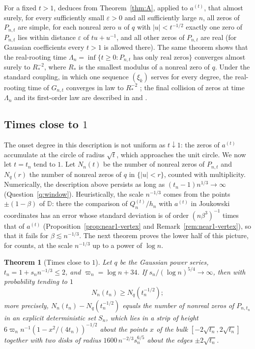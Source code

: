 \documentclass[11pt]{amsart}
\newtheorem{theorem}{Theorem}[section]
\theoremstyle{definition}
\theoremstyle{remark}
\numberwithin{equation}{section}
\newcommand{\D}{\mathbb{D}}
\newcommand{\eps}{\varepsilon}
\begin{document}
For a fixed $t>1$, \cite[Theorem~\ref{M-thm:heat}]{Main} deduces from Theorem~\ref{thm:A}, applied to $a^{(t)}$, that almost surely, for every sufficiently small $\eps>0$ and all sufficiently large $n$, all zeros of $P_{n,t}$ are simple, for each nonreal zero $u$ of $q$ with $|u|<t^{-1/2}$ exactly one zero of $P_{n,t}$ lies within distance $\eps$ of $tu+u^{-1}$, and all other zeros of $P_{n,t}$ are real (for Gaussian coefficients every $t>1$ is allowed there). The same theorem shows that the real-rooting time $\Lambda_n=\inf\{t\ge0:P_{n,t}\text{ has only real zeros}\}$ converges almost surely to $R_*^{-2}$, where $R_*$ is the smallest modulus of a nonreal zero of $q$. Under the standard coupling, in which one sequence $(\xi_k)$ serves for every degree, the real-rooting time of $G_{n,t}$ converges in law to $R_*^{-2}$ \cite[Theorem~\ref{M-cor:weyl}]{Main}; the final collision of zeros at time $\Lambda_n$ and its first-order law are described in \cite[Section~\ref{M-sec:collision}]{Main} and \cite[Section~\ref{M-sec:firstorder}]{Main}.

\subsection{Times close to \texorpdfstring{$1$}{1}}\label{sec:intro-near1}
The onset degree in this description is not uniform as $t\downarrow1$: the zeros of $a^{(t)}$ accumulate at the circle of radius $\sqrt t$, which approaches the unit circle. We now let $t=t_n$ tend to $1$. Let $N_n(t)$ be the number of nonreal zeros of $P_{n,t}$ and $N_q(r)$ the number of nonreal zeros of $q$ in $\{|u|<r\}$, counted with multiplicity. Numerically, the description above persists as long as $(t_n-1)n^{1/3}\to\infty$ (Question~\ref{q:window}). Heuristically, the scale $n^{-1/3}$ comes from the points $\pm(1-\beta)$ of $\D$: there the comparison of $Q_n^{(t)}/h_n$ with $a^{(t)}$ in Joukowski coordinates has an error whose standard deviation is of order $(n\beta^3)^{-1}$ times that of $a^{(t)}$ (Proposition~\ref{prop:near1-vertex} and Remark~\ref{rem:near1-vertex}), so that it fails for $\beta\lesssim n^{-1/3}$. The next theorem proves the lower half of this picture, for counts, at the scale $n^{-1/3}$ up to a power of $\log n$.

\begin{theorem}[Times close to $1$]\label{thm:window-intro}
Let $q$ be the Gaussian power series, $t_n=1+s_nn^{-1/3}\le2$, and $\varpi_n=\log n+34$. If $s_n/(\log n)^{5/4}\to\infty$, then with probability tending to $1$
\[
N_n(t_n)\ge N_q(t_n^{-1/2});
\]
more precisely, $N_n(t_n)-N_q(t_n^{-1/2})$ equals the number of nonreal zeros of $P_{n,t_n}$ in an explicit deterministic set $S_n$, which lies in a strip of height $6\varpi_nn^{-1}(1-x^2/(4t_n))^{-1/2}$ about the points $x$ of the bulk $[-2\sqrt{t_n},2\sqrt{t_n}]$ together with two disks of radius $1600\,n^{-2/3}s_n^{6/5}$ about the edges $\pm2\sqrt{t_n}$.
\end{theorem}
\end{document}
